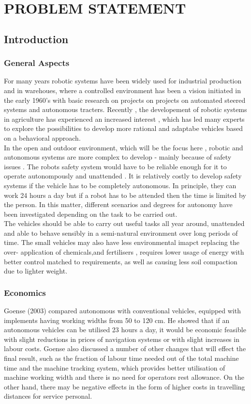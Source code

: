 \documentclass{report}
\begin{document}
\chapter{PROBLEM STATEMENT}
\section{Introduction}
\subsection{General Aspects}
For many years robotic systems have been widely used for industrial production and in warehoues, where a controlled environment has been a vision initiated in the early 1960's with basic research on projects on projects on automated steered systems and autonomous tracters. Recently , the developement of robotic systems in agriculture has experienced an increased interest , which has led many experts to explore the possibilities to develop more rational and adaptabe vehicles based on a behavioral approach.\\
In the open and outdoor environment, which will be the focus here , robotic and autonomous systems are more complex to develop - mainly because of safety issues . The robots safety system would have to be reliable enough for it to operate autonompously and unattended . It is relatively costly to develop safety systems if the vehicle has to be completely autonomous. In principle, they can work 24 hours a day but if a robot has to be attended then the time is limited by the person. In this matter, different scenarios and degrees for autonomy have been investigated depending on the task to be carried out.\\
The vehicles should be able to carry out useful tasks all year around, unattended and able to behave sensibly in a semi-natural environment over long periods of time. The small vehicles may also have less environmental imapct replacing the over- application of chemicals,and fertilisers , requires lower usage of energy with better control matched to requirements, as well as causing less soil compaction due to lighter weight.
\subsection{Economics}
Goense (2003) compared autonomous with conventional vehicles, equipped with implements having working
widths from 50 to 120 cm. He showed that if an autonomous vehicles can be utilised 23 hours a day, it would
be economic feasible with slight reductions in prices of navigation systems or with slight increases in labour
costs. Goense also discussed a number of other changes that will effect the final result, such as the fraction
of labour time needed out of the total machine time and the machine tracking system, which provides better
utilisation of machine working width and there is no need for operators rest allowance. On the other hand,
there may be negative effects in the form of higher costs in travelling distances for service personal.
\end{document}
